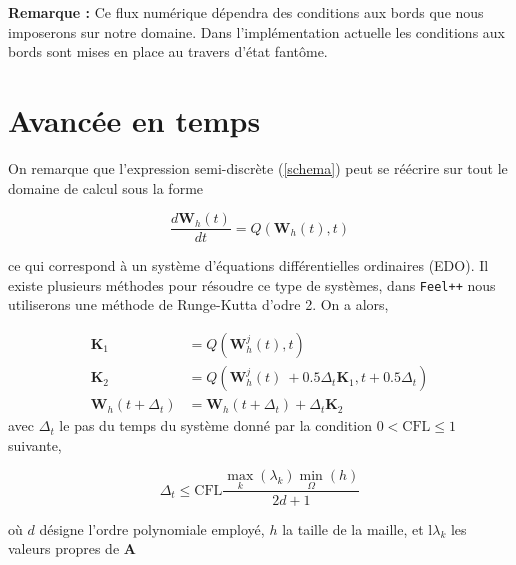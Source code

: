 \documentclass[a4paper,oneside,10pt]{report}
\begin{document}
\textbf{Remarque :} Ce flux numérique dépendra des conditions aux bords que nous imposerons sur notre domaine. Dans l'implémentation actuelle les conditions aux bords sont mises en place au travers d'état fantôme.



\section{Avancée en temps}


On remarque que l'expression semi-discrète (\ref{schema}) peut se réécrire sur tout le domaine de calcul sous la forme

\begin{equation}
\frac{d\mathbf{W}_{h}(t)}{dt} = Q\left(\mathbf{W}_{h}(t),t\right)
\end{equation}

ce qui correspond à un système d'équations différentielles ordinaires (EDO). Il existe plusieurs méthodes pour résoudre ce type de systèmes, dans \texttt{Feel++} nous utiliserons une méthode de Runge-Kutta d'odre 2. On a alors,


\begin{equation}
\begin{aligned}
\mathbf{K}_1 &= Q\left(\mathbf{W}_{h}^j(t),t\right)\\
\mathbf{K}_2 &= Q\left(\mathbf{W}_{h}^j(t)\ + 0.5\Delta_t\mathbf{K}_1 ,t + 0.5\Delta_t \right)\\
\mathbf{W}_{h}(t+\Delta_t) &= \mathbf{W}_{h}(t+\Delta_t) + \Delta_t\mathbf{K}_2
\end{aligned}
\end{equation}
avec $\Delta_t$ le pas du temps du système donné par la condition $0 < \mathrm{CFL} \leq 1$ suivante,

\begin{equation}
\Delta_t \leq \mathrm{CFL} \frac{\max\limits_k(\lambda_k) \min\limits_\Omega (h)}{2d+1}
\end{equation}

où $d$ désigne l'ordre polynomiale employé, $h$ la taille de la maille, et l$\lambda_k$ les valeurs propres de $\mathbf{A}$
\end{document}
